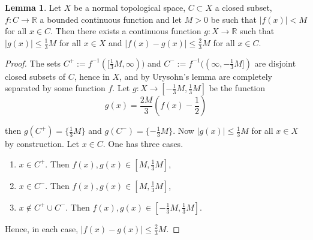 \documentclass{book}
\theoremstyle{definition}
\newtheorem{lemma}[theorem]{Lemma}
\theoremstyle{remark}
\newcommand{\R}{\mathbb{R}}
\begin{document}
\begin{lemma}
Let $X$ be a normal topological space, $C\subset X$ a closed subset, $f:C\to\R$ a bounded continuous function and let $M>0$ be such that $|f(x)|<M$ for all $x\in C$. Then there exists a continuous function $g:X\to\R$ such that $|g(x)|\leq\tfrac{1}{3}M$ for all $x\in X$ and $|f(x)-g(x)|\leq \tfrac{2}{3}M$ for all $x\in C$.
\end{lemma}
\begin{proof}
The sets $C^+:=f^{-1}([\tfrac{1}{3}M,\infty))$ and $C^-:=f^{-1}((\infty,-\tfrac{1}{3}M])$ are disjoint closed subsets of $C$, hence in $X$, and by Urysohn's lemma are completely separated by some function $f$. Let $g:X\to[-\tfrac{1}{3}M,\tfrac{1}{3}M]$ be the function $$g(x)=\frac{2M}{3}\left(f(x)-\frac{1}{2}\right)$$

then $g(C^+)=\{\tfrac{1}{3}M\}$ and $g(C^-)=\{-\tfrac{1}{3}M\}$. Now $|g(x)|\leq \tfrac{1}{3}M$ for all $x\in X$ by construction. Let $x\in C$. One has three cases.
\begin{enumerate}
    \item $x\in C^+$. Then $f(x),g(x)\in[M,\tfrac{1}{3}M]$,
    \item $x\in C^-$. Then $f(x),g(x)\in[M,\tfrac{1}{3}M]$,
    \item $x\notin C^+\cup C^-$. Then $f(x),g(x)\in[-\tfrac{1}{3}M,\tfrac{1}{3}M]$.
\end{enumerate}
Hence, in each case, $|f(x)-g(x)|\leq \tfrac{2}{3}M$.
\end{proof}
\end{document}
